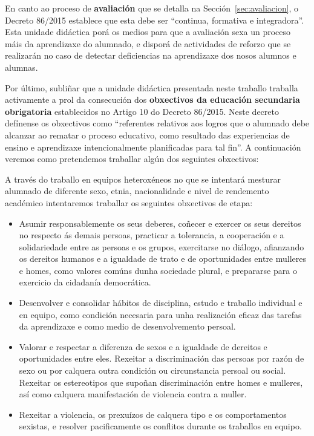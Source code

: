 En canto ao proceso de \textbf{avaliación} que se detalla na Sección~\ref{sec:avaliacion}, o Decreto 86/2015 establece que esta debe ser ``continua, formativa e integradora''.  Esta unidade didáctica porá os medios para que a avaliación sexa un proceso máis da aprendizaxe do alumnado, e disporá de actividades de reforzo que se realizarán no caso de detectar deficiencias na aprendizaxe dos nosos alumnos e alumnas.

Por último, subliñar que a unidade didáctica presentada neste traballo traballa activamente a prol da consecución dos \textbf{obxectivos da educación secundaria obrigatoria} establecidos no Artigo 10 do Decreto 86/2015. Neste decreto defínense os obxectivos como ``referentes relativos aos logros que o alumnado debe alcanzar ao rematar o proceso educativo, como resultado das experiencias de ensino e aprendizaxe intencionalmente planificadas para tal fin''. A continuación veremos como pretendemos traballar algún dos seguintes obxectivos:

A través do traballo en equipos heteroxéneos no que se intentará mesturar alumnado de diferente sexo, etnia, nacionalidade e nivel de rendemento académico intentaremos traballar os seguintes obxectivos de etapa:

\begin{itemize}
    \item Asumir responsablemente os seus deberes, coñecer e exercer os seus dereitos no respecto ás demais persoas, practicar a tolerancia, a cooperación e a solidariedade entre as persoas e os grupos, exercitarse no diálogo, afianzando os dereitos humanos e a igualdade de trato e de oportunidades entre mulleres e homes, como valores comúns dunha sociedade plural, e prepararse para o exercicio da cidadanía democrática.

    \item Desenvolver e consolidar hábitos de disciplina, estudo e traballo individual e en equipo, como condición necesaria para unha realización eficaz das tarefas da aprendizaxe e como medio de desenvolvemento persoal.

    \item Valorar e respectar a diferenza de sexos e a igualdade de dereitos e oportunidades entre eles. Rexeitar a discriminación das persoas por razón de sexo ou por calquera outra condición ou circunstancia persoal ou social. Rexeitar os estereotipos que supoñan discriminación entre homes e mulleres, así como calquera manifestación de violencia contra a muller.

    \item Rexeitar a violencia, os prexuízos de calquera tipo e os comportamentos sexistas, e resolver pacificamente os conflitos durante os traballos en equipo.
\end{itemize}

